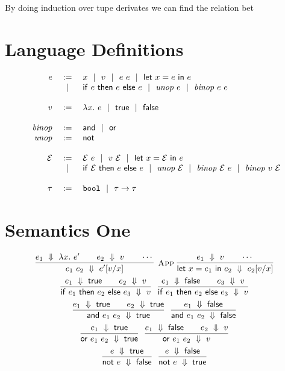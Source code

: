 \documentclass[10pt]{article}
\begin{document}
   \vskip 0.2in
   By doing induction over tupe derivates we can find the relation bet
  
  
  
  
  
  
  
  
  
  
  \newpage
\section{Language Definitions}

\[
  \begin{array}{rcl}
  e  &:=& x \alt v \alt e~e \alt \letdefe{x}{e}{e}\\
     &\alt& \ife{e}{e}{e} \alt \unope{e} \alt \binope{e}{e}\\
  \\ %
  v  &:=& \lamdefe{x}{e} \alt \truev \alt \falsev\\
  \\
  \binopdef &:=& \andop \alt \orop\\
  \unopdef  &:=& \notop \\
  \\
  \Ctxt &:=& \Ctxt~e \alt v~\Ctxt \alt \letdefe{x}{\Ctxt}{e}\\
  &\alt& \ife{\Ctxt}{e}{e} \alt \unope{\Ctxt} \alt \binope{\Ctxt}{e} \alt \binope{v}{\Ctxt}\\
  \\
  \tau  &:=& \boolt \alt \funct{\tau}{\tau}\\
  \end{array}
\]

\section{Semantics One}

\begin{gather*}
\infr[App]
  {\dstep{e_1}{\lamdefe{x}{e'}} \iand \dstep{e_2}{v} \iand \cdots}
  {\dstep{e_1~e_2}{\subst{x}{v}{e'}}}
~
\infr
  {\dstep{e_1}{v} \iand \cdots}
  {\dstep{\letdefe{x}{e_1}{e_2}}{\subst{x}{v}{e_2}}}
\\
\infr
  {\dstep{e_1}{\truev} \iand \dstep{e_2}{v}}
  {\dstep{\ife{e_1}{e_2}{e_3}}{v}}
~
\infr
  {\dstep{e_1}{\falsev} \iand \dstep{e_3}{v}}
  {\dstep{\ife{e_1}{e_2}{e_3}}{v}}
\\
\infr
  {\dstep{e_1}{\truev} \iand \dstep{e_2}{\truev}}
  {\dstep{\ande{e_1}{e_2}}{\truev}}
~
\infr
  {\dstep{e_1}{\falsev}}
  {\dstep{\ande{e_1}{e_2}}{\falsev}}
\\
\infr
  {\dstep{e_1}{\truev}}
  {\dstep{\ore{e_1}{e_2}}{\truev}}
~
\infr
  {\dstep{e_1}{\falsev} \iand \dstep{e_2}{v}}
  {\dstep{\ore{e_1}{e_2}}{v}}
\\
\infr
  {\dstep{e}{\truev}}
  {\dstep{\note{e}}{\falsev}}
~
\infr
  {\dstep{e}{\falsev}}     
  {\dstep{\note{e}}{\truev}}
\end{gather*}
\end{document}
